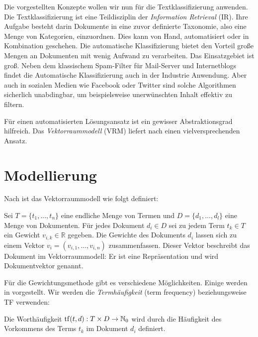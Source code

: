 Die vorgestellten Konzepte wollen wir nun für die Textklassifizierung anwenden. 
Die Textklassifizierung ist eine Teildisziplin der \emph{Information Retrieval} (IR). Ihre Aufgabe besteht darin Dokumente in eine zuvor definierte Taxonomie, also eine Menge von Kategorien, einzuordnen. Dies kann von Hand, automatisiert oder in Kombination geschehen. Die automatische Klassifizierung bietet den Vorteil große Mengen an Dokumenten mit wenig Aufwand zu verarbeiten. Das Einsatzgebiet ist groß. Neben dem klassischem Spam-Filter für Mail-Server und Internetblogs findet die Automatische Klassifizierung auch in der Industrie Anwendung. Aber auch in sozialen Medien wie Facebook oder Twitter sind solche Algorithmen sicherlich unabdingbar, um beispielsweise unerwünschten Inhalt effektiv zu filtern. 

Für einen automatisierten Lösungsansatz ist ein gewisser Abstraktionsgrad hilfreich. Das \emph{Vektorraummodell} (VRM) liefert nach \cite{j-tcsvmmf} einen vielversprechenden Ansatz.

\section{Modellierung} 
Nach \cite{f-ir} ist das Vektorraummodell wie folgt definiert:
\begin{definition}[Vektorraummodell]
	\label{def-vrm}
	Sei $T = \{t_1,...,t_n\}$ eine endliche Menge von Termen und $D=\{ d_1,...,d_l \}$ eine Menge von Dokumenten. Für jedes Dokument $d_i \in D$ sei zu jedem Term $t_k \in T$ ein Gewicht $v_{i,k} \in \mathbb{R}$ gegeben. Die Gewichte des Dokuments $d_i$ lassen sich zu einem Vektor $v_i = (v_{i,1},...,v_{i,n})$ zusammenfassen. Dieser Vektor beschreibt das Dokument im Vektorraummodell: Er ist eine Repräsentation und wird Dokumentvektor genannt.
\end{definition}

Für die Gewichtungsmethode gibt es verschiedene Möglichkeiten. Einige werden in \cite{f-ir} vorgestellt. Wir werden die \emph{Termhäufigkeit}  (term frequency) beziehungsweise TF verwenden:

\begin{definition}
	\label{def-tf}
	Die Worthäufigkeit $\operatorname{tf}(t,d):T \times D \rightarrow \mathbb{N}_0$ wird durch die Häufigkeit des Vorkommens des Terms $t_k$ im Dokument $d_i$ definiert.
\end{definition}

